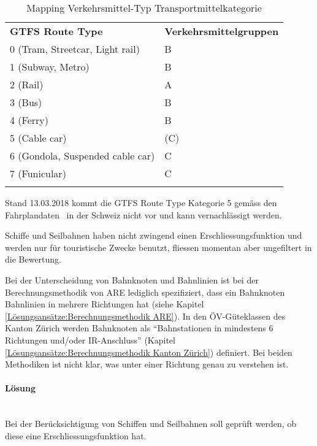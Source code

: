 \begin{longtable}[ht]{l l}
        \midrule
        \textbf{GTFS Route Type} 
                                & \textbf{Verkehrsmittelgruppen}\\
        0 (Tram, Streetcar, Light rail)
                                & B\\
        1 (Subway, Metro)
                                & B\\
        2 (Rail)
                                & A\\
        3 (Bus)
                                & B\\
        4 (Ferry)
                                & B\\
        5 (Cable car)
                                & (C)\\
        6 (Gondola, Suspended cable car)
                                & C\\
        7 (Funicular)
                                & C\\            
        \bottomrule
    \caption{Mapping Verkehrsmittel-Typ Transportmittelkategorie}
    \label{table:Mapping Verkehrsmittel-Typ Transportmittelkategorie}
\end{longtable}

Stand 13.03.2018 kommt die GTFS Route Type Kategorie 5 gemäss den Fahrplandaten~\cite{geops_fahrplandaten} in der Schweiz nicht vor und kann vernachlässigt werden.

Schiffe und Seilbahnen haben nicht zwingend einen Erschliessungsfunktion und werden nur für touristische Zwecke benutzt, fliessen momentan aber ungefiltert in die Bewertung.


Bei der Unterscheidung von Bahnknoten und Bahnlinien ist bei der Berechnungsmethodik von ARE lediglich spezifiziert, dass ein Bahnknoten Bahnlinien in mehrere Richtungen hat (siehe Kapitel \ref{Lösungsansätze:Berechnungsmethodik ARE}).
In den ÖV-Güteklassen des Kanton Zürich werden Bahnknoten als "`Bahnstationen in mindestens 6 Richtungen und/oder IR-Anschluss"' (Kapitel \ref{Lösungsansätze:Berechnungsmethodik Kanton Zürich}) definiert.
Bei beiden Methodiken ist nicht klar, was unter einer Richtung genau zu verstehen ist.


\paragraph{Lösung}~\\
Bei der Berücksichtigung von Schiffen und Seilbahnen soll geprüft werden, ob diese eine Erschliessungsfunktion hat.

